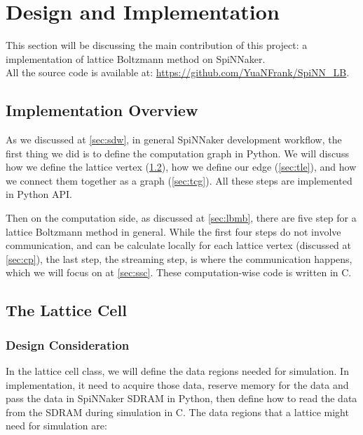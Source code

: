 

\newpage
\section{Design and Implementation}
This section will be discussing the main contribution of this project: a implementation of lattice Boltzmann method on SpiNNaker.  \\

All the source code is available at: \url{https://github.com/YuaNFrank/SpiNN_LB}.
\subsection{Implementation Overview}

As we discussed at \ref{sec:sdw}, in general SpiNNaker development workflow, the first thing we did is to define the computation graph in Python. We will discuss how we define the lattice vertex (\ref{sec:tlc}), how we define our edge (\ref{sec:tle}), and how we connect them together as a graph (\ref{sec:tcg}). All these steps are implemented in Python API.

Then on the computation side, as discussed at \ref{sec:lbmb}, there are five step for a lattice Boltzmann method in general. While the first four steps do not involve communication, and can be calculate locally for each lattice vertex (discussed at \ref{sec:cp}), the last step, the streaming step, is where the communication happens, which we will focus on at \ref{sec:ssc}. These computation-wise code is written in C.

\subsection{The Lattice Cell} \label{sec:tlc}
\subsubsection{Design Consideration} \label{sec:tlcdc}
In the lattice cell class, we will define the data regions needed for simulation. In implementation, it need to acquire those data, reserve memory for the data and pass the data in SpiNNaker SDRAM in Python, then define how to read the data from the SDRAM during simulation in C. The data regions that a lattice might need for simulation are: \\

